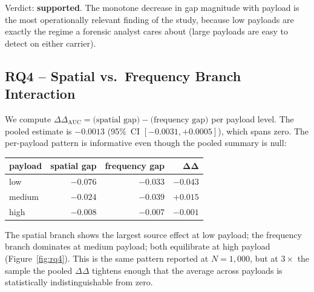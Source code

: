 \documentclass[10pt,twocolumn,a4paper]{article}
\begin{document}
Verdict: \textbf{supported}. The monotone decrease in gap magnitude with payload is the most operationally relevant finding of the study, because low payloads are exactly the regime a forensic analyst cares about (large payloads are easy to detect on either carrier).

\subsection{RQ4 -- Spatial vs.\ Frequency Branch Interaction}
\label{sec:rq4}

We compute $\Delta\Delta_\text{AUC}\!=\!\text{(spatial gap)}-\text{(frequency gap)}$ per payload level. The pooled estimate is $-0.0013$ (95\%~CI $[-0.0031,+0.0005]$), which spans zero. The per-payload pattern is informative even though the pooled summary is null:

\begin{center}\small
\begin{tabular}{lrrr}
\textbf{payload} & \textbf{spatial gap} & \textbf{frequency gap} & $\boldsymbol{\Delta\Delta}$ \\
\midrule
low    & $-0.076$ & $-0.033$ & $-0.043$ \\
medium & $-0.024$ & $-0.039$ & $+0.015$ \\
high   & $-0.008$ & $-0.007$ & $-0.001$ \\
\end{tabular}
\end{center}

The spatial branch shows the largest source effect at low payload; the frequency branch dominates at medium payload; both equilibrate at high payload (Figure~\ref{fig:rq4}). This is the same pattern reported at $N\!=\!1{,}000$, but at $3\!\times\!$ the sample the pooled $\Delta\Delta$ tightens enough that the average across payloads is statistically indistinguishable from zero.
\end{document}

